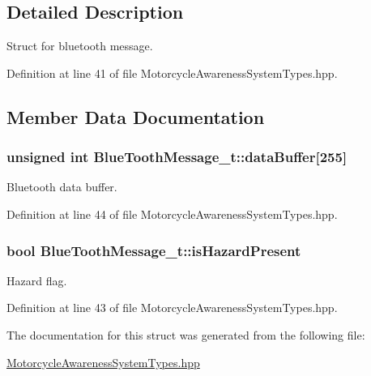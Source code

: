 \subsection{Detailed Description}
Struct for bluetooth message. 

Definition at line 41 of file Motorcycle\-Awareness\-System\-Types.\-hpp.



\subsection{Member Data Documentation}
\hypertarget{structBlueToothMessage__t_ab872789a32f068dae8bcf77122256b78}{
\subsubsection[{data\-Buffer}]{\setlength{\rightskip}{0pt plus 5cm}unsigned int Blue\-Tooth\-Message\-\_\-t\-::data\-Buffer\mbox{[}255\mbox{]}}}\label{structBlueToothMessage__t_ab872789a32f068dae8bcf77122256b78}


Bluetooth data buffer. 



Definition at line 44 of file Motorcycle\-Awareness\-System\-Types.\-hpp.

\hypertarget{structBlueToothMessage__t_a2dd315aa1cba1d2d3045e26b9f171e61}{
\subsubsection[{is\-Hazard\-Present}]{\setlength{\rightskip}{0pt plus 5cm}bool Blue\-Tooth\-Message\-\_\-t\-::is\-Hazard\-Present}}\label{structBlueToothMessage__t_a2dd315aa1cba1d2d3045e26b9f171e61}


Hazard flag. 



Definition at line 43 of file Motorcycle\-Awareness\-System\-Types.\-hpp.



The documentation for this struct was generated from the following file\-:\begin{DoxyCompactItemize}
\item 
\hyperlink{MotorcycleAwarenessSystemTypes_8hpp}{Motorcycle\-Awareness\-System\-Types.\-hpp}\end{DoxyCompactItemize}
